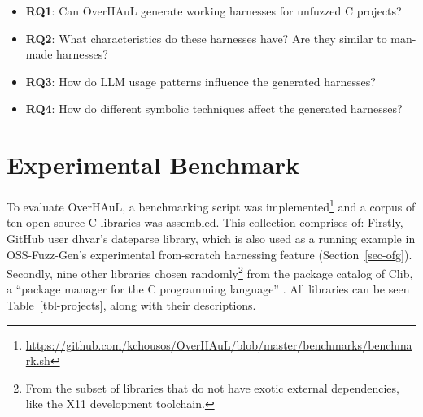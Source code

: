 \documentclass[
  a4paper,
]{scrreprt}
\theoremstyle{definition}
\theoremstyle{remark}
\begin{document}
\begin{itemize}
\item
  \textbf{RQ1}: Can OverHAuL generate working harnesses for unfuzzed C
  projects?
\item
  \textbf{RQ2}: What characteristics do these harnesses have? Are they
  similar to man-made harnesses?
\item
  \textbf{RQ3}: How do LLM usage patterns influence the generated
  harnesses?
\item
  \textbf{RQ4}: How do different symbolic techniques affect the
  generated harnesses?
\end{itemize}

\section{Experimental Benchmark}\label{sec-benchmark}

To evaluate OverHAuL, a benchmarking script was implemented\footnote{\url{https://github.com/kchousos/OverHAuL/blob/master/benchmarks/benchmark.sh}}
and a corpus of ten open-source C libraries was assembled. This
collection comprises of: Firstly, GitHub user dhvar's dateparse library,
which is also used as a running example in OSS-Fuzz-Gen's
\autocite{oss-fuzz-gen} experimental from-scratch harnessing feature
(Section~\ref{sec-ofg}). Secondly, nine other libraries chosen
randomly\footnote{From the subset of libraries that do not have exotic
  external dependencies, like the X11 development toolchain.} from the
package catalog of Clib, a ``package manager for the C programming
language'' \autocite{clibs,clib}. All libraries can be seen
Table~\ref{tbl-projects}, along with their descriptions.
\end{document}
